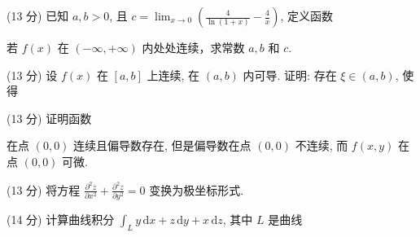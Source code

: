 \par{}
(13 分) 已知 $a, b > 0$, 且 $c = \lim_{x \to 0} \left( \frac{4}{\ln(1 + x)} - \frac{4}{x} \right)$, 定义函数\par
\nopagebreak[4]
若 $f(x)$ 在 $(-\infty, +\infty)$ 内处处连续，求常数 $a, b$ 和 $c$.\par
\par{}
(13 分) 设 $f(x)$ 在 $[a, b]$ 上连续, 在 $(a, b)$ 内可导. 证明: 存在 $\xi \in (a, b)$, 使得\par
\nopagebreak[4]
\par{}
(13 分) 证明函数\par
\nopagebreak[4]
在点 $(0,0)$ 连续且偏导数存在, 但是偏导数在点 $(0,0)$ 不连续, 而 $f(x,y)$ 在点 $(0,0)$ 可微.\par
(13 分) 将方程 $\frac{\partial^2 z}{\partial x^2} + \frac{\partial^2 z}{\partial y^2} = 0$ 变换为极坐标形式.\par
\par{}
(14 分) 计算曲线积分 $\int_{L} y \, \mathrm{d}x + z \, \mathrm{d}y + x \, \mathrm{d}z$, 其中 $L$ 是曲线\par
